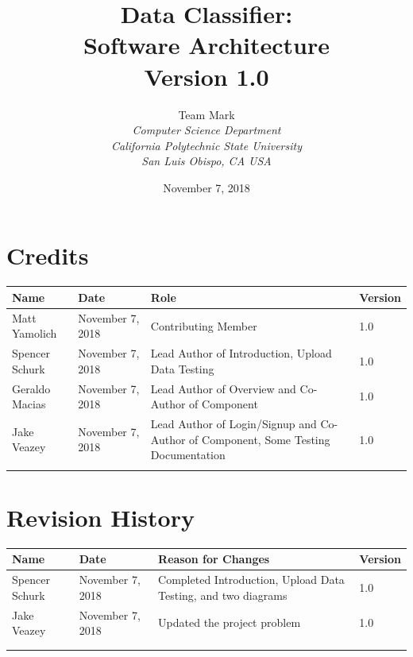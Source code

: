 \documentclass[12pt,oneside,letterpaper]{article}
\begin{document}
\title{\bfseries Data Classifier: \\
Software Architecture\\
Version 1.0}

\author {
\large{Team Mark}\\
\emph{Computer Science Department}\\
\emph{California Polytechnic State University}\\
\emph{San Luis Obispo, CA USA}\\
}

\date{November 7, 2018}
\maketitle \thispagestyle{empty}

\pagebreak
\tableofcontents



\section*{Credits}
\begin{tabular}{|l|l|p{2.5in}|l|}
\hline
\textbf{Name}&\textbf{Date}&\textbf{Role}&\textbf{Version}\\
\hline
Matt Yamolich &November 7, 2018&Contributing Member&1.0\\
\hline
Spencer Schurk&November 7, 2018&Lead Author of Introduction, Upload Data Testing&1.0\\
\hline
Geraldo Macias&November 7, 2018&Lead Author of Overview and Co-Author of Component&1.0\\
\hline
Jake Veazey&November 7, 2018&Lead Author of Login/Signup and Co-Author of Component, Some Testing Documentation&1.0\\
\hline
&&&\\
\hline
\end{tabular}

\section*{Revision History}
\begin{tabular}{|l|l|p{2.5in}|l|}
\hline
\textbf{Name}&\textbf{Date}&\textbf{Reason for Changes}&\textbf{Version}\\
\hline
Spencer Schurk&November 7, 2018&Completed Introduction, Upload Data Testing, and two diagrams&1.0\\
\hline
Jake Veazey&November 7, 2018&Updated the project problem&1.0\\
\hline
&&&\\
\hline
&&&\\
\hline
\end{tabular}
\end{document}
